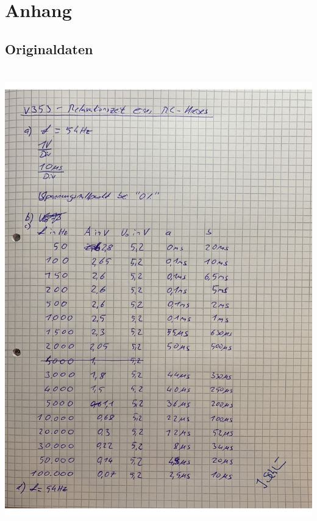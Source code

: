 \section{Anhang}
\label{sec:Anhang}
\subsection{Originaldaten}
\includegraphics[height=20cm]{content/Originaldaten.pdf}